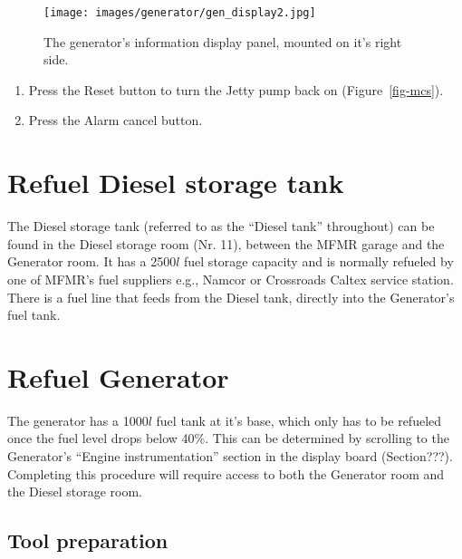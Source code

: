 \documentclass[
  12pt,
]{report}
\providecommand{\tightlist}{%
  \setlength{\itemsep}{0pt}\setlength{\parskip}{0pt}}\usepackage{longtable,booktabs,array}
\begin{document}
\begin{figure}[H]

{\centering \texttt{[image: images/generator/gen\_display2.jpg]}

}

\caption{\label{fig-gen-display}The generator's information display
panel, mounted on it's right side.}

\end{figure}

\begin{enumerate}
\def\labelenumi{\arabic{enumi}.}
\setcounter{enumi}{13}
\tightlist
\item
  Press the Reset button to turn the Jetty pump back on
  (Figure~\ref{fig-mcs}).
\item
  Press the Alarm cancel button.
\end{enumerate}

\hypertarget{refuel-diesel-storage-tank}{%
\section{Refuel Diesel storage tank}\label{refuel-diesel-storage-tank}}

The Diesel storage tank (referred to as the ``Diesel tank'' throughout)
can be found in the Diesel storage room (Nr. 11), between the MFMR
garage and the Generator room. It has a 2500\(l\) fuel storage capacity
and is normally refueled by one of MFMR's fuel suppliers e.g., Namcor or
Crossroads Caltex service station. There is a fuel line that feeds from
the Diesel tank, directly into the Generator's fuel tank.

\hypertarget{refuel-generator}{%
\section{Refuel Generator}\label{refuel-generator}}

The generator has a 1000\(l\) fuel tank at it's base, which only has to
be refueled once the fuel level drops below 40\%. This can be determined
by scrolling to the Generator's ``Engine instrumentation'' section in
the display board (Section???). Completing this procedure will require
access to both the Generator room and the Diesel storage room.

\hypertarget{sec-gen-fuel-tool}{%
\subsection{Tool preparation}\label{sec-gen-fuel-tool}}
\end{document}
